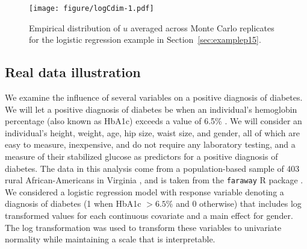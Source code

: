 \documentclass{article}\usepackage[]{graphicx}\usepackage[]{color}
\begin{document}
\begin{figure}[h!]
	\texttt{[image: figure/logCdim-1.pdf]}
	\caption{Empirical distribution of $u$ averaged across Monte Carlo replicates for the logistic regression example in Section~\ref{sec:examplep15}.}
	\label{fig:logCdim}
\end{figure}



\subsection{Real data illustration}


We examine the influence of several variables on a positive diagnosis of diabetes. We will let a positive diagnosis of diabetes be when an individual's hemoglobin percentage (also known as HbA1c) exceeds a value of 6.5\% \citep{world2011use}. We will consider an individual's height, weight, age, hip size, waist size, and gender, all of which are easy to measure, inexpensive, and do not require any laboratory testing, and a measure of their stabilized glucose as predictors for a positive diagnosis of diabetes. The data in this analysis come from a population-based sample of 403 rural African-Americans in Virginia \citep{willems1997prevalence}, and is taken from the \texttt{faraway} R package \citep{faraway2016R}. We considered a logistic regression model with response variable denoting a diagnosis of diabetes (1 when HbA1c $> 6.5\%$ and $0$ otherwise) that includes log transformed values for each continuous covariate and a main effect for gender. The log transformation was used to transform these variables to univariate normality while maintaining a scale that is interpretable. 
\end{document}

